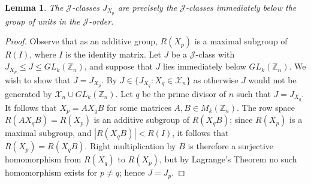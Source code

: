 \documentclass[11pt]{article}
\newtheorem{lemma}[thm]{Lemma}
\numberwithin{equation}{section}
\newcommand{\set}[2]{\ensuremath{\{#1 : #2 \}}}
\newcommand{\J}{\mathscr{J}}
\newcommand{\Z}{\mathbb{Z}}
\begin{document}
\begin{lemma}
  \label{lem:ZnImmediatelyBelow}
  The $\J$-classes $J_{X_p}$ are precisely the $\J$-classes immediately below
  the group of units in the $\J$-order.
\end{lemma}
\begin{proof}
Observe that as an additive group, $R(X_p)$ is a maximal subgroup
of $R(I)$, where $I$ is the identity matrix. Let $J$ be a $\J$-class with
$J_{X_p} \leq J \leq GL_k(\Z_n)$, and suppose that $J$ lies immediately below
$GL_k(\Z_n)$. We wish to show that $J = J_{X_p}$. By  $J \in
\set{J_{X_q}}{X_q \in \mathcal{X}_n}$ as otherwise $J$ would not be generated by
$\mathcal{X}_n \cup GL_k(\Z_n)$. Let $q$ be the prime divisor of $n$ such that
$J = J_{X_q}$. It follows that $X_p = AX_qB$ for some matrices $A, B \in
M_k(\Z_n)$. The row space $R(AX_qB) = R(X_p)$ is an additive subgroup of
$R(X_qB)$; since $R(X_p)$ is a maximal subgroup, and $|R(X_qB)| < R(I)$, it
follows that $R(X_p) = R(X_qB)$. Right multiplication by $B$ is therefore a
surjective homomorphism from $R(X_q)$ to $R(X_p)$, but by Lagrange's Theorem no
such homomorphism exists for $p \neq q$; hence $J = J_p$.
\end{proof}

\printbibliography
\end{document}
